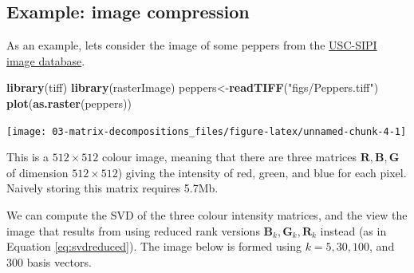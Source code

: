\documentclass[
]{book}
\newenvironment{Shaded}{\begin{snugshade}}{\end{snugshade}}
\newcommand{\FunctionTok}[1]{\textcolor[rgb]{0.13,0.29,0.53}{\textbf{#1}}}
\newcommand{\NormalTok}[1]{#1}
\newcommand{\OtherTok}[1]{\textcolor[rgb]{0.56,0.35,0.01}{#1}}
\newcommand{\StringTok}[1]{\textcolor[rgb]{0.31,0.60,0.02}{#1}}
\theoremstyle{definition}
\theoremstyle{definition}
\theoremstyle{definition}
\theoremstyle{definition}
\theoremstyle{remark}
\begin{document}
\hypertarget{example-image-compression}{%
\subsection{Example: image compression}\label{example-image-compression}}

As an example, lets consider the image of some peppers from the \href{http://sipi.usc.edu/database/}{USC-SIPI image database}.

\begin{Shaded}
\begin{Highlighting}[]
\FunctionTok{library}\NormalTok{(tiff)}
\FunctionTok{library}\NormalTok{(rasterImage)}
\NormalTok{peppers}\OtherTok{\textless{}{-}}\FunctionTok{readTIFF}\NormalTok{(}\StringTok{"figs/Peppers.tiff"}\NormalTok{)}
\FunctionTok{plot}\NormalTok{(}\FunctionTok{as.raster}\NormalTok{(peppers))}
\end{Highlighting}
\end{Shaded}

\texttt{[image: 03-matrix-decompositions\_files/figure-latex/unnamed-chunk-4-1]}

This is a \(512 \times 512\) colour image, meaning that there are three matrices \(\mathbf R, \mathbf B,\mathbf G\) of dimension \(512\times 512\)) giving the intensity of red, green, and blue for each pixel.
Naively storing this matrix requires 5.7Mb.

We can compute the SVD of the three colour intensity matrices, and the view the image that results from using reduced rank versions \(\mathbf B_k, \mathbf G_k, \mathbf R_k\) instead (as in Equation \eqref{eq:svdreduced}). The image below is formed using \(k=5, 30, 100\), and \(300\) basis vectors.
\end{document}
